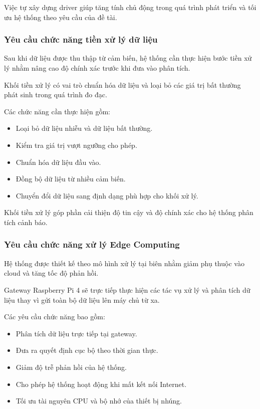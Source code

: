 Việc tự xây dựng driver giúp tăng tính chủ động trong quá trình phát triển và tối ưu hệ thống theo yêu cầu của đề tài.


\subsubsection{Yêu cầu chức năng tiền xử lý dữ liệu}


Sau khi dữ liệu được thu thập từ cảm biến, hệ thống cần thực hiện bước tiền xử lý nhằm nâng cao độ chính xác trước khi đưa vào phân tích.


Khối tiền xử lý có vai trò chuẩn hóa dữ liệu và loại bỏ các giá trị bất thường phát sinh trong quá trình đo đạc.


Các chức năng cần thực hiện gồm:


\begin{itemize}
    \item Loại bỏ dữ liệu nhiễu và dữ liệu bất thường.
    \item Kiểm tra giá trị vượt ngưỡng cho phép.
    \item Chuẩn hóa dữ liệu đầu vào.
    \item Đồng bộ dữ liệu từ nhiều cảm biến.
    \item Chuyển đổi dữ liệu sang định dạng phù hợp cho khối xử lý.
\end{itemize}


Khối tiền xử lý góp phần cải thiện độ tin cậy và độ chính xác cho hệ thống phân tích cảnh báo.


\subsubsection{Yêu cầu chức năng xử lý Edge Computing}


Hệ thống được thiết kế theo mô hình xử lý tại biên nhằm giảm phụ thuộc vào cloud và tăng tốc độ phản hồi.


Gateway Raspberry Pi 4 sẽ trực tiếp thực hiện các tác vụ xử lý và phân tích dữ liệu thay vì gửi toàn bộ dữ liệu lên máy chủ từ xa.


Các yêu cầu chức năng bao gồm:


\begin{itemize}
    \item Phân tích dữ liệu trực tiếp tại gateway.
    \item Đưa ra quyết định cục bộ theo thời gian thực.
    \item Giảm độ trễ phản hồi của hệ thống.
    \item Cho phép hệ thống hoạt động khi mất kết nối Internet.
    \item Tối ưu tài nguyên CPU và bộ nhớ của thiết bị nhúng.
\end{itemize}


